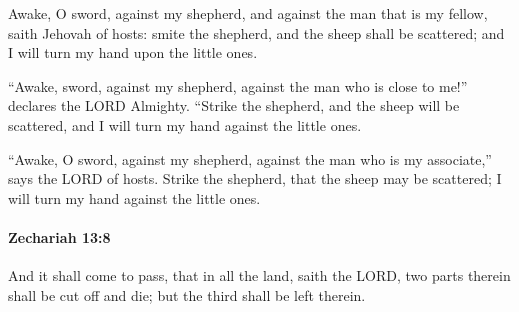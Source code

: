 			\begin{versebox}
					\item[BHS] 
					\item[LXX] 
					\item[ASV] Awake, O sword, against my shepherd, and against the man that is my fellow, saith Jehovah of hosts: smite the shepherd, and the sheep shall be scattered; and I will turn my hand upon the little ones.
					\item[NIV] “Awake, sword, against my shepherd, against the man who is close to me!” declares the LORD Almighty. “Strike the shepherd, and the sheep will be scattered, and I will turn my hand against the little ones.
					\item[NRSV] “Awake, O sword, against my shepherd, against the man who is my associate,” says the LORD of hosts. Strike the shepherd, that the sheep may be scattered; I will turn my hand against the little ones.
			\end{versebox}

		\paragraph{Zechariah 13:8} %
			\label{ZECHARIAH-13-8}

			And it shall come to pass, that in all the land, saith the LORD, two parts therein shall be cut off and die; but the third shall be left therein.

